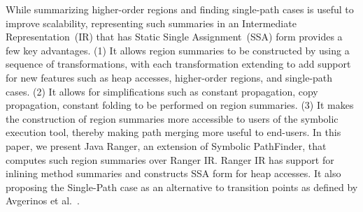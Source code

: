 While summarizing higher-order regions and finding single-path cases is useful to improve scalability,
representing such summaries in an Intermediate Representation~(IR) that has Static Single Assignment~(SSA) form
provides a few key advantages.
%
(1) It allows region summaries to be constructed by using a sequence of transformations, with each transformation
extending to add support for new features such as heap accesses, higher-order regions, and single-path cases.
%
(2) It allows for simplifications such as constant propagation, copy propagation, constant folding to be performed on region summaries.
%
(3) It makes the construction of region summaries more accessible to users of the symbolic execution tool, thereby making
path merging more useful to end-users.
%
In this paper, we present Java Ranger, an extension of Symbolic PathFinder, that computes such region summaries over
Ranger IR.
%
Ranger IR has support for inlining method summaries and constructs SSA form for heap accesses.
%
It also proposing the Single-Path case as an alternative to transition points as
defined by Avgerinos et al.~\cite{veritesting}.
%
